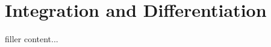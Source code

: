 \section{Integration and Differentiation}\label{sec:integration-and-differentiation}

filler content...

